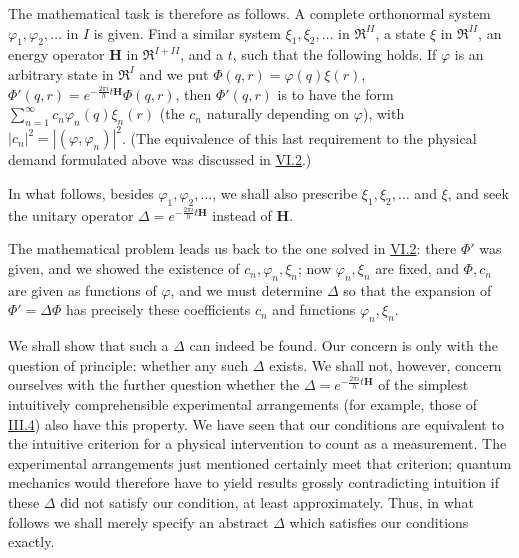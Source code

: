 \documentclass[fontsize=13pt,twoside,openany,headings=normal,parskip=false,bookmarkpackage=false,DIV=calc]{scrbook}
\begin{document}
The mathematical task is therefore as follows. A complete orthonormal system $\varphi_1,\varphi_2,\ldots$ in $I$ is given. Find a similar system $\xi_1,\xi_2,\ldots$ in $\mathfrak R^{II}$, a state $\xi$ in $\mathfrak R^{II}$, an energy operator $\boldsymbol H$ in $\mathfrak R^{I+II}$, and a $t$, such that the following holds. If $\varphi$ is an arbitrary state in $\mathfrak R^I$ and we put $\Phi(q,r)=\varphi(q)\xi(r)$, $\Phi'(q,r)=e^{-\frac{2\pi i}{h}t\boldsymbol H}\Phi(q,r)$, then $\Phi'(q,r)$ is to have the form $\sum_{n=1}^{\infty}c_n\varphi_n(q)\xi_n(r)$ (the $c_n$ naturally depending on $\varphi$), with $|c_n|^2=|(\varphi,\varphi_n)|^2$.
\hypertarget{origpage-235}{}%
(The equivalence of this last requirement to the physical demand formulated above was discussed in \hyperref[sec:VI.2]{VI.2}.)

In what follows, besides $\varphi_1,\varphi_2,\ldots$, we shall also prescribe $\xi_1,\xi_2,\ldots$ and $\xi$, and seek the unitary operator $\Delta=e^{-\frac{2\pi i}{h}t\boldsymbol H}$ instead of $\boldsymbol H$.

The mathematical problem leads us back to the one solved in \hyperref[sec:VI.2]{VI.2}: there $\Phi'$ was given, and we showed the existence of $c_n,\varphi_n,\xi_n$; now $\varphi_n,\xi_n$ are fixed, and $\Phi,c_n$ are given as functions of $\varphi$, and we must determine $\Delta$ so that the expansion of $\Phi'=\Delta\Phi$ has precisely these coefficients $c_n$ and functions $\varphi_n,\xi_n$.

We shall show that such a $\Delta$ can indeed be found. Our concern is only with the question of principle: whether any such $\Delta$ exists. We shall not, however, concern ourselves with the further question whether the $\Delta=e^{-\frac{2\pi i}{h}t\boldsymbol H}$ of the simplest intuitively comprehensible experimental arrangements (for example, those of \hyperref[sec:III.4]{III.4}) also have this property. We have seen that our conditions are equivalent to the intuitive criterion for a physical intervention to count as a measurement. The experimental arrangements just mentioned certainly meet that criterion; quantum mechanics would therefore have to yield results grossly contradicting intuition if these $\Delta$ did not satisfy our condition, at least approximately. Thus, in what follows we shall merely specify an abstract $\Delta$ which satisfies our conditions exactly.
\end{document}
